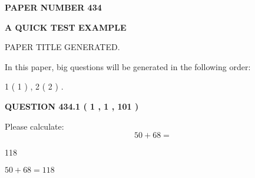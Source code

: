 \documentclass[12pt]{article}
\begin{document}
   
   
   
\newpage 
\setcounter{page}{ 
   434001 } 
   
   
   
   
 {\textbf{ \Large{ PAPER NUMBER  434  }}}
   
   
\vspace{0.2in}
   
   
   
   
   
   
   
   
 \vspace{0.2in}
{\LARGE {\textbf{ A QUICK TEST EXAMPLE}}}
   
   
 PAPER TITLE GENERATED.
   
   
   
\vspace{0.2in}
   
In this paper, big questions will be generated in the following order: 
   
   
   1 ( 1 )
 ,
   2 ( 2 )
 .
  
\vspace{0.2in}
  
{\textbf{\Large{QUESTION
434.1 
 ( 1 , 1 , 101 )
}}}
  
  
 
Please calculate:
\begin{equation}
50 +  %
68 = \nonumber
\end{equation}
 
 
 
\noindent{}
 
 

118
 
 
\noindent{}
 
 

 
 
 
\noindent{}
 
 

$ %
50 +  %
68=   %
118$
 
 
\noindent{}
 
 

 
   
\end{document}
